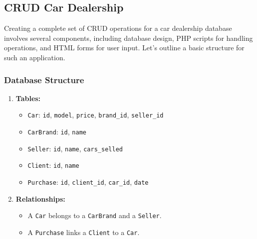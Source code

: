 \documentclass[11pt]{article}
\begin{document}
\subsection{CRUD Car Dealership}
\label{sec:org61cae48}
Creating a complete set of CRUD operations for a car dealership database
involves several components, including database design, PHP scripts for
handling operations, and HTML forms for user input. Let's outline a
basic structure for such an application.

\subsubsection{Database Structure}
\label{sec:orgabe3ddc}
\begin{enumerate}
\item \textbf{Tables:}

\begin{itemize}
\item \texttt{Car}: \texttt{id}, \texttt{model}, \texttt{price}, \texttt{brand\_id}, \texttt{seller\_id}
\item \texttt{CarBrand}: \texttt{id}, \texttt{name}
\item \texttt{Seller}: \texttt{id}, \texttt{name}, \texttt{cars\_selled}
\item \texttt{Client}: \texttt{id}, \texttt{name}
\item \texttt{Purchase}: \texttt{id}, \texttt{client\_id}, \texttt{car\_id}, \texttt{date}
\end{itemize}

\item \textbf{Relationships:}

\begin{itemize}
\item A \texttt{Car} belongs to a \texttt{CarBrand} and a \texttt{Seller}.
\item A \texttt{Purchase} links a \texttt{Client} to a \texttt{Car}.
\end{itemize}
\end{enumerate}
\end{document}
